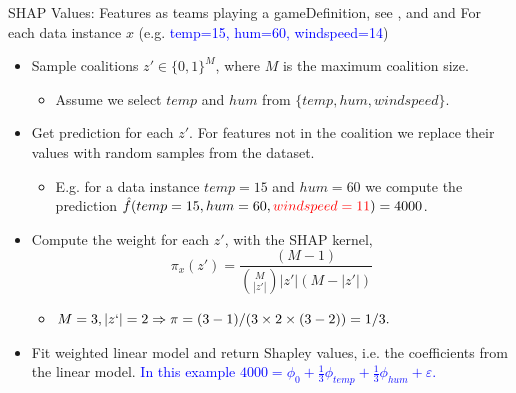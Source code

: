 \documentclass[10pt]{beamer}
\begin{document}
\begin{frame}{SHAP Values: Features as teams playing a game}{Definition, see \cite{NIPS2017_7062}, and \cite[Chapters 5 \& 6]{masis2021} and \cite[Section 9.6]{molnar2019}}
For each data instance $x$ (e.g. \textcolor{blue}{temp=15, hum=60, windspeed=14})
\begin{itemize}
\item Sample coalitions $z'\in\{0, 1\}^{M}$, where $M$ is the maximum coalition size.
\begin{itemize}
\item \color{blue} Assume we select $temp$ and $hum$ from $\{temp, hum, windspeed\}$.
\end{itemize}
\pause
\item Get prediction for each $z'$. For features not in the coalition we replace their values with random samples from the dataset.
\begin{itemize}
\item \color{blue} E.g. for a data instance $temp = 15$ and $hum = 60$ we compute the prediction $\hat{f}(temp=15, hum=60, \textcolor{red}{windspeed=11}) = 4000$.
\end{itemize}
\pause
\item Compute the weight for each $z'$, with the SHAP kernel, 
$$\pi_{x}(z') = \frac{(M-1)}{\binom{M}{|z'|}|z'|(M-|z'|)} $$
\begin{itemize}
\item \color{blue} $M=3, |z`|=2 \Rightarrow \pi = (3 - 1)/(3 \times 2\times(3 - 2)) = 1/3.$
\end{itemize}
\pause
\item Fit weighted linear model and  return Shapley values, i.e. the coefficients from the linear model.
\textcolor{blue}{In this example $4000 = \phi_0 + \frac{1}{3}\phi_{temp} + \frac{1}{3}\phi_{hum} + \varepsilon$.}
\end{itemize}
\end{frame}
\end{document}
